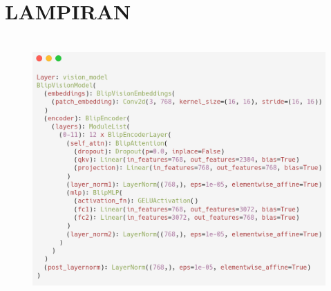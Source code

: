 \titleformat{\section}{\normalfont\bfseries}{\thesection}{1em}{}
\chapter*{LAMPIRAN}




\begin{figure}[H]
  \centering
  \includegraphics[width=\textwidth, height = 10cm]{image/lampiran/blip-vision-model.png}
  \label{fig:layer-vision-blip}
\end{figure}


